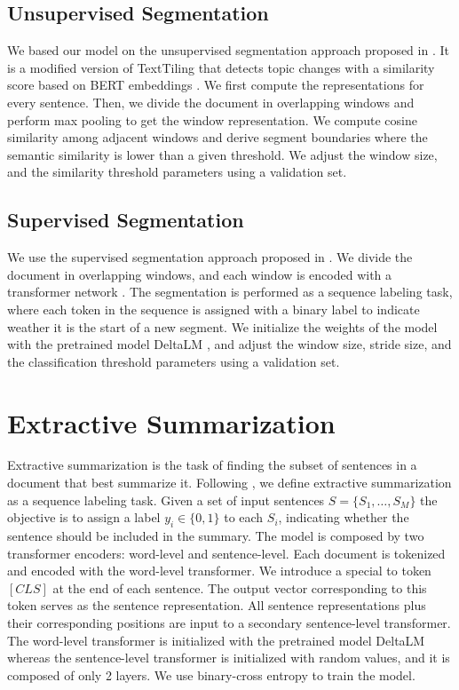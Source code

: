 \documentclass[sigconf]{acmart}
\begin{document}
\subsection{Unsupervised Segmentation}
We based our model on the unsupervised segmentation approach proposed in \cite{solbiati2021unsupervised}. It is a modified version of TextTiling \cite{hearst-1997-text} that detects topic changes with a similarity score based on BERT embeddings \cite{devlin-etal-2019-bert}. We first compute the representations for every sentence. Then, we divide the document in overlapping windows and perform max pooling to get the window representation. We compute cosine similarity among adjacent windows and derive segment boundaries where the semantic similarity is lower than a given threshold.
We adjust the window size, and the similarity threshold parameters using a validation set.

\subsection{Supervised Segmentation}
We use the supervised segmentation approach proposed in \cite{zhang2021sequence}. We divide the document in overlapping windows, and each window is encoded with a transformer network \cite{10.5555/3295222.3295349}. The segmentation is performed as a sequence labeling task, where each token in the sequence is assigned with a binary label to indicate weather it is the start of a new segment. We initialize the weights of the model with the pretrained model DeltaLM \cite{ma2021deltalm}, and adjust the window size, stride size, and the classification threshold parameters using a validation set.

\section{Extractive Summarization}\label{sec:sum}
Extractive summarization is the task of finding the subset of sentences in a document that best summarize it. Following \cite{liu-lapata-2019-text}, we define extractive summarization as a sequence labeling task.  Given a set of input sentences $S = \{S_1, …, S_M\}$ the objective is to assign a label $y_i \in \{0, 1\}$ to each $S_i$, indicating whether the sentence should be included in the summary. The model is composed by two transformer encoders: word-level and sentence-level. Each document is tokenized and encoded with the word-level transformer. We introduce a special to token $[CLS]$ at the end of each sentence. The output vector corresponding to  this token serves as the sentence representation. All sentence representations plus their corresponding positions are input to a secondary sentence-level transformer. The word-level transformer is initialized with the pretrained model DeltaLM \cite{ma2021deltalm} whereas the sentence-level transformer is initialized with random values, and it is composed of only 2 layers. We use binary-cross entropy to train the model. 
\end{document}
